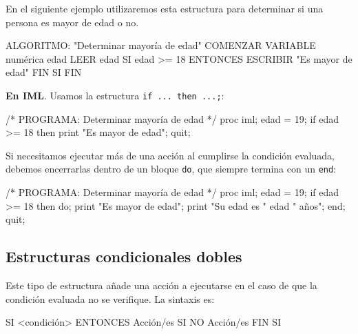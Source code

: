 \documentclass[
]{book}
\newenvironment{Shaded}{\begin{snugshade}}{\end{snugshade}}
\newcommand{\NormalTok}[1]{#1}
\begin{document}
En el siguiente ejemplo utilizaremos esta estructura para determinar si una persona es mayor de edad o no.

\begin{Shaded}
\begin{Highlighting}[]
\NormalTok{ALGORITMO: "Determinar mayoría de edad"}
\NormalTok{COMENZAR}
\NormalTok{    VARIABLE numérica edad}
\NormalTok{    LEER edad}
\NormalTok{    SI edad \textgreater{}= 18 ENTONCES}
\NormalTok{        ESCRIBIR "Es mayor de edad"}
\NormalTok{    FIN SI}
\NormalTok{FIN}
\end{Highlighting}
\end{Shaded}

\textbf{En IML}. Usamos la estructura \texttt{if\ ...\ then\ ...;}:

\begin{Shaded}
\begin{Highlighting}[]
\NormalTok{/* PROGRAMA: Determinar mayoría de edad */}
\NormalTok{proc iml;}
\NormalTok{    edad = 19;}
\NormalTok{    if edad \textgreater{}= 18 then print "Es mayor de edad";}
\NormalTok{quit;}
\end{Highlighting}
\end{Shaded}

Si necesitamos ejecutar más de una acción al cumplirse la condición evaluada, debemos encerrarlas dentro de un bloque \texttt{do}, que siempre termina con un \texttt{end}:

\begin{Shaded}
\begin{Highlighting}[]
\NormalTok{/* PROGRAMA: Determinar mayoría de edad */}
\NormalTok{proc iml;}
\NormalTok{    edad = 19;}
\NormalTok{    if edad \textgreater{}= 18 then do;}
\NormalTok{        print "Es mayor de edad";}
\NormalTok{        print "Su edad es " edad " años";}
\NormalTok{    end;}
\NormalTok{quit;}
\end{Highlighting}
\end{Shaded}

\hypertarget{estructuras-condicionales-dobles}{%
\subsection{Estructuras condicionales dobles}\label{estructuras-condicionales-dobles}}

Este tipo de estructura añade una acción a ejecutarse en el caso de que la condición evaluada no se verifique. La sintaxis es:

\begin{Shaded}
\begin{Highlighting}[]
\NormalTok{SI \textless{}condición\textgreater{} }
\NormalTok{    ENTONCES}
\NormalTok{        Acción/es}
\NormalTok{    SI NO}
\NormalTok{        Acción/es}
\NormalTok{FIN SI}
\end{Highlighting}
\end{Shaded}
\end{document}
